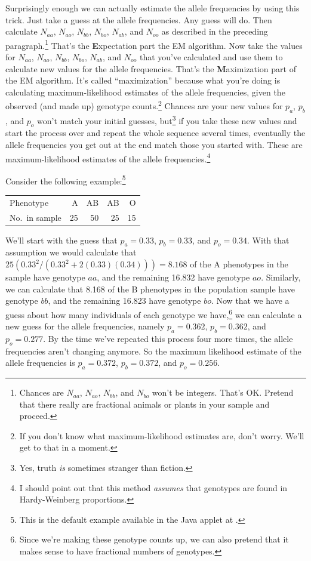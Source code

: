 \documentclass[12pt]{article}
\begin{document}
Surprisingly enough we can actually estimate the allele frequencies by
using this trick. Just take a guess at the allele frequencies. Any
guess will do. Then calculate $N_{aa}$, $N_{ao}$, $N_{bb}$, $N_{bo}$,
$N_{ab}$, and $N_{oo}$ as described in the preceding
paragraph.\footnote{Chances are $N_{aa}$, $N_{ao}$, $N_{bb}$, and
  $N_{bo}$ won't be integers. That's OK. Pretend that there really are
  fractional animals or plants in your sample and proceed.} That's the
{\bf E}xpectation part the EM algorithm. Now take the values for
$N_{aa}$, $N_{ao}$, $N_{bb}$, $N_{bo}$, $N_{ab}$, and $N_{oo}$ that
you've calculated and use them to calculate new values for the allele
frequencies. That's the {\bf M}aximization part of the EM
algorithm. It's called ``maximization'' because what you're doing is
calculating maximum-likelihood estimates of the allele frequencies,
given the observed (and made up) genotype counts.\footnote{If you
  don't know what maximum-likelihood estimates are, don't worry. We'll
  get to that in a moment.} Chances are your new values for $p_a$,
$p_b$, and $p_o$ won't match your initial guesses, but\footnote{Yes,
  truth {\it is\/} sometimes stranger than fiction.}  if you take
these new values and start the process over and repeat the whole
sequence several times, eventually the allele frequencies you get out
at the end match those you started with. These are maximum-likelihood
estimates of the allele frequencies.\footnote{I should point out that
  this method {\it assumes\/} that genotypes are found in
  Hardy-Weinberg proportions.}

Consider the following example:\footnote{This is the default example
available in the Java applet at
.}
\begin{center}
\begin{tabular}{l|rrrr}
\hline\hline
Phenotype      & A      & AB      & AB     & O  \\
No.\ in sample & 25     & 50      & 25     & 15 \\
\hline
\end{tabular}
\end{center}
We'll start with the guess that $p_a = 0.33$, $p_b = 0.33$, and $p_o =
0.34$. With that assumption we would calculate that $25(0.33^2/(0.33^2
+ 2(0.33)(0.34))) = 8.168$ of the A phenotypes in the sample have
genotype $aa$, and the remaining 16.832 have genotype $ao$. Similarly,
we can calculate that 8.168 of the B phenotypes in the population
sample have genotype $bb$, and the remaining 16.823 have genotype
$bo$. Now that we have a guess about how many individuals of each
genotype we have,\footnote{Since we're making these genotype counts
  up, we can also pretend that it makes sense to have fractional
  numbers of genotypes.} we can calculate a new guess for the allele
frequencies, namely $p_a = 0.362$, $p_b = 0.362$, and $p_o =
0.277$. By the time we've repeated this process four more times, the
allele frequencies aren't changing anymore. So the maximum likelihood
estimate of the allele frequencies is $p_a = 0.372$, $p_b = 0.372$,
and $p_o = 0.256$.
\end{document}
